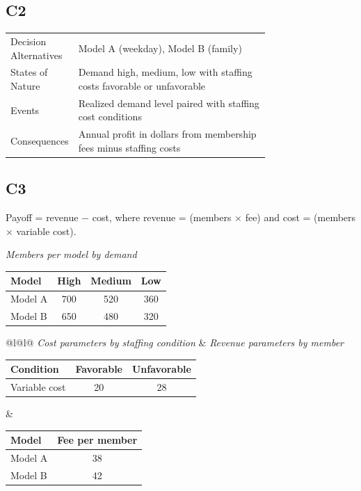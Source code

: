 \begin{ExamProblems}
		\subsection*{C2}
		\begin{center}
			\begin{tabular}{l p{0.74\linewidth}}
				\toprule
				Decision Alternatives & Model A (weekday), Model B (family) \\
				States of Nature & Demand high, medium, low with staffing costs favorable or unfavorable \\
				Events & Realized demand level paired with staffing cost conditions \\
				Consequences & Annual profit in dollars from membership fees minus staffing costs \\
				\bottomrule
			\end{tabular}
		\end{center}

		\subsection*{C3}
		Payoff = revenue $-$ cost, where revenue = (members $\times$ fee) and cost = (members $\times$ variable cost).
		\begin{center}
			\textit{Members per model by demand} \\
			\begin{tabular}{l c c c}
				\toprule
				Model & High & Medium & Low \\
				\midrule
				Model A & 700 & 520 & 360 \\
				Model B & 650 & 480 & 320 \\
				\bottomrule
		\end{tabular}
		\end{center}
		\begin{center}
			\begin{tabular}{@{}l@{\hspace{0.06\linewidth}}l@{}}
				\textit{Cost parameters by staffing condition} & \textit{Revenue parameters by member} \\
				\begin{tabular}{l c c}
					\toprule
					Condition & Favorable & Unfavorable \\
					\midrule
					Variable cost & 20 & 28 \\
					\bottomrule
				\end{tabular}
				&
				\begin{tabular}{l c}
					\toprule
					Model & Fee per member \\
					\midrule
					Model A & 38 \\
					Model B & 42 \\
					\bottomrule
				\end{tabular}
			\end{tabular}
		\end{center}


\end{ExamProblems}
